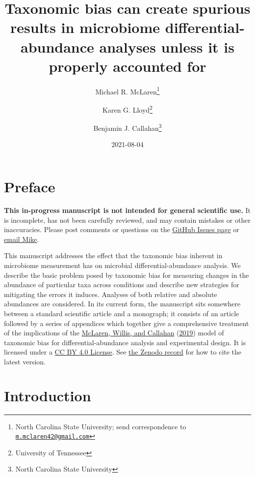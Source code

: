 \documentclass[
]{article}
\title{Taxonomic bias can create spurious results in microbiome differential-abundance analyses unless it is properly accounted for}
\author{Michael R. McLaren\footnote{North Carolina State University; send correspondence to \href{mailto:m.mclaren42@gmail.com}{\nolinkurl{m.mclaren42@gmail.com}}} \and Karen G. Lloyd\footnote{University of Tennessee} \and Benjamin J. Callahan\footnote{North Carolina State University}}
\date{2021-08-04}
\theoremstyle{definition}
\theoremstyle{definition}
\theoremstyle{definition}
\theoremstyle{definition}
\theoremstyle{remark}
\begin{document}
\maketitle

{
\setcounter{tocdepth}{2}
\tableofcontents
}
\hypertarget{preface}{%
\section*{Preface}\label{preface}}

\leavevmode{}%
\textbf{This in-progress manuscript is not intended for general scientific use.}
It is incomplete, has not been carefully reviewed, and may contain mistakes or other inaccuracies.
Please post comments or questions on the \href{https://github.com/mikemc/differential-abundance-theory/issues}{GitHub Issues page} or \href{m.mclaren42@gmail.com}{email Mike}.

This manuscript addresses the effect that the taxonomic bias inherent in microbiome measurement has on microbial differential-abundance analysis.
We describe the basic problem posed by taxonomic bias for measuring changes in the abundance of particular taxa across conditions and describe new strategies for mitigating the errors it induces.
Analyses of both relative and absolute abundances are considered.
In its current form, the manuscript sits somewhere between a standard scientific article and a monograph;
it consists of an article followed by a series of appendices which together give a comprehensive treatment of the implications of the \protect\hyperlink{ref-mclaren2019cons}{McLaren, Willis, and Callahan} (\protect\hyperlink{ref-mclaren2019cons}{2019}) model of taxonomic bias for differential-abundance analysis and experimental design.
It is licensed under a \href{https://creativecommons.org/licenses/by/4.0/}{CC BY 4.0 License}.
See \href{https://doi.org/10.5281/zenodo.4552717}{the Zenodo record} for how to cite the latest version.

\hypertarget{introduction}{%
\section{Introduction}\label{introduction}}
\end{document}
